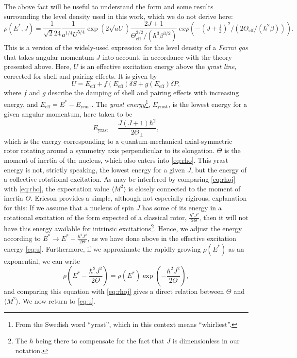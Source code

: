 The above fact will be useful to understand the form and some results surrounding the level density used in this work, which we do not derive here:
\begin{equation}
\rho(E^*,J) = \frac{1}{\sqrt{2}24}
\frac{1}{a^{1/4} U^{5/4}} \exp{(2\sqrt{aU})}
\frac{2J+1}{\Theta_\text{eff}^{3/2}/(\hbar^3\beta^{3/2})}\ exp{\left(-(J+\tfrac{1}{2})^2/(2\Theta_\text{eff}/(\hbar^2\beta))\right)}.\label{eq:rho}
\end{equation}
This is a version of the widely-used expression for the level density of a \emph{Fermi gas} that takes angular momentum $J$ into account, in accordance with the theory presented above\cite{ripl:2006}. 
Here, $U$ is an effective excitation energy above the \emph{yrast line}, corrected for shell and pairing effects. It is given by
\begin{equation}
U=E_\text{eff} + f(E_\text{eff})\delta S + g(E_\text{eff})\delta P,\label{eq:u}
\end{equation}
where $f$ and $g$ describe the damping of shell and pairing effects with increasing energy, and $E_\text{eff} = E^*-E_\text{yrast}$. The \emph{yrast energy}\footnote{From the Swedish word ``yrast'', which in this context means ``whirliest''\cite{yrast}.}, $E_\text{yrast}$, is the lowest energy for a given angular momentum, here taken to be
\begin{equation}
E_\text{yrast} = \frac{J(J+1)\hbar^2}{2\Theta_\perp},
\end{equation}
which is the energy corresponding to a quantum-mechanical axial-symmetric rotor rotating around a symmetry axis perpendicular to its elongation. $\Theta$ is the moment of inertia of the nucleus, which also enters into \eqref{eq:rho}. This yrast energy is not, strictly speaking, the lowest energy for a given $J$, but the energy of a collective rotational excitation\cite{ericson:1960}.
As may be interfered by comparing \eqref{eq:rhoj} with \eqref{eq:rho}, the expectation value $\langle M^2 \rangle$ is closely connected to the moment of inertia $\Theta$.
Ericson\cite{ericson:1960} provides a simple, although not especially rigirous, explanation for this:
If we assume that a nucleus of spin $J$ has some of its energy in a rotational excitation of the form expected of a classical rotor, $\frac{\hbar^2J^2}{2\Theta}$, then it will not have this energy available for intrinsic excitations\footnote{The $\hbar$ being there to compensate for the fact that $J$ is dimensionless in our notation.}. Hence, we adjust the energy according to $E^* \to E^* - \frac{\hbar^2J^2}{2\Theta}$, as we have done above in the effective excitation energy \eqref{eq:u}. Furthermore, if we approximate the rapidly growing $\rho(E^*)$ as an exponential, we can write
\begin{equation}
\rho(E^* - \frac{\hbar^2J^2}{2\Theta}) = \rho(E^*) \exp{(-\frac{\hbar^2J^2}{2\Theta})},
\end{equation}
and comparing this equation with \eqref{eq:rhoj} gives a direct relation between $\Theta$ and $\langle M^2 \rangle$. We now return to \autoref{eq:u}.
